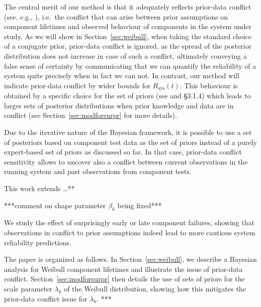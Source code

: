 \documentclass[Journal,SectionNumbers,SingleSpace,InsideFigs]{ascelike}
\newcommand{\Rsys}{R_\text{sys}}
\def\Rsys{R_\text{sys}}
\begin{document}
The central merit of our method is that it adequately reflects prior-data conflict
(see, e.g., ),
i.e.\ the conflict that can arise between prior assumptions on component lifetimes
and observed behaviour of components in the system under study.
As we will show in Section~\ref{sec:weibull}, when taking the standard choice of a conjugate prior,
prior-data conflict is ignored, as the spread of the posterior distribution does not increase in case of such a conflict,
ultimately conveying a false sense of certainty
by communicating that we can quantify the reliability of a system quite precisely when in fact we can not.
%
In contrast, our method will indicate prior-data conflict by wider bounds for $\Rsys(t)$.
This behaviour is obtained by a specific choice for the set of priors (see  and  \S 3.1.4)
which leads to larger sets of posterior distributions when prior knowledge and data are in conflict
(see Section~\ref{sec:modforsurpr} for more details).

Due to the iterative nature of the Bayesian framework,
it is possible to use a set of posteriors based on component test data as the set of priors
instead of a purely expert-based set of priors as discussed so far.
In that case, prior-data conflict sensitivity allows to uncover also a conflict between
current observations in the running system and past observations from component tests.

This work extends \ldots ***

***comment on shape parameter $\beta_k$ being fixed***

We study the effect of surprisingly early or late component failures,
showing that observations in conflict to prior assumptions
indeed lead to more cautious system reliability predictions.

  
The paper is organized as follows.
In Section~\ref{sec:weibull}, we describe a Bayesian analysis for Weibull component lifetimes
and illustrate the issue of prior-data conflict.
Section~\ref{sec:modforsurpr} then details the use of sets of priors
for the scale parameter $\lambda_k$ of the Weibull distribution,
showing how this mitigates the prior-data conflict issue for $\lambda_k$.
***

\end{document}

